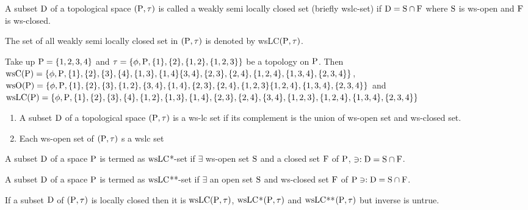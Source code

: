 \begin{dfn}\label{defi7.2.1}
A subset $\mathrm{D}$ of a topological space $(\mathrm{P}, \tau)$ is called a weakly semi locally closed set (briefly wslc-set) if $\mathrm{D} = \mathrm{S} \cap \mathrm{F}$ where $\mathrm{S}$ is ws-open and $\mathrm{F}$ is ws-closed.
\end{dfn}

The set of all weakly semi locally closed set in $(\mathrm{P},\tau)$ is denoted by wsLC$(\mathrm{P}, \tau)$.

\begin{exm}\label{exam7.2.1}
Take up $\mathrm{P} = \{1,2,3,4\}$ and $\tau = \{\phi,\mathrm{P}, \{1\}, \{2\}, \{1,2\},\{1,2,3\}\}$ be a topology on $\mathrm{P}$. Then $\ws\TSC(\TSP) = \{\phi, \TSP,\{1\}, \{2\}, \{3\}, \{4\}, \{1,3\}, \{1,4\} \{3,4\}, \{2,3\},\break \{2,4\}, \{1,2,4\},\{1,3,4\},\{2,3,4\}\}$, $\ws\TSO(\TSP) = \{\phi, \TSP, \{1\}, \{2\}, \{3\},\{1,2\}, \{3,4\}, \{1,4\},\break \{2,3\}, \{2,4\}, \{1,2,3\}\{1,2,4\},\{1,3,4\},\{2,3,4\}\}$ and $\ws\LC(\TSP)=\{\phi,\TSP,\{1\},\{2\},\{3\},\break \{4\},\{1,2\},\{1,3\},\{1,4\},\{2,3\},\{2,4\},\{3,4\},\{1,2,3\},\{1,2,4\},\{1,3,4\},\{2,3,4\}\}$
\end{exm}

\begin{rem}\label{rem7.2.1}
\begin{enumerate}[(1)]
\item A subset $\mathrm{D}$ of a topological space $(\mathrm{P}, \tau)$ is a ws-lc set if its complement is the union of ws-open set and ws-closed set.
\item Each ws-open set of $(\mathrm{P}, \tau)$ s a wslc set
\end{enumerate}
\end{rem}

\begin{dfn}\label{defi7.2.2}
A subset $\mathrm{D}$ of a space $\mathrm{P}$ is termed as $\mathrm{ws}\mathrm{LC}$*-set if $\exists$ ws-open set $\mathrm{S}$ and a closed set $\mathrm{F}$ of $\mathrm{P}$, $\ni: \mathrm{D} = \mathrm{S} \cap \mathrm{F}$.
\end{dfn}

\begin{dfn}\label{defi7.2.3}
A subset $\mathrm{D}$ of a space $\mathrm{P}$ is termed as $\mathrm{ws}\mathrm{LC}${*}{*}-set if $\exists$ an open set $\mathrm{S}$ and ws-closed set $\mathrm{F}$ of $\mathrm{P} \ni: \mathrm{D} = \mathrm{S}\cap \mathrm{F}$.
\end{dfn}

\begin{thm}\label{thm7.2.1}
If a subset $\mathrm{D}$ of $(\mathrm{P}, \tau)$ is locally closed then it is $\mathrm{ws}\mathrm{LC}(\mathrm{P}, \tau)$, $\mathrm{ws}\mathrm{LC}$*$(\mathrm{P}, \tau)$ and $\mathrm{ws}\mathrm{LC}${*}{*}$(\mathrm{P}, \tau)$ but inverse is untrue.
\end{thm}

